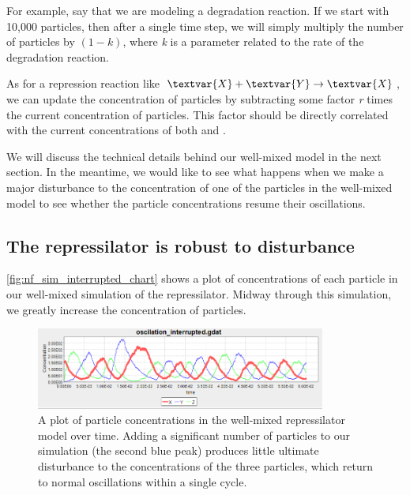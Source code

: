For example, say that we are modeling a degradation reaction. If we start with 10,000  particles, then after a single time step, we will simply multiply the number of  particles by $(1-k)$, where \textit{k} is a parameter related to the rate of the degradation reaction.

As for a repression reaction like $\textvar{X} + \textvar{Y} \rightarrow \textvar{X}$, we can update the concentration of  particles by subtracting some factor \textit{r} times the current concentration of  particles. This factor should be directly correlated with the current concentrations of both  and .

We will discuss the technical details behind our well-mixed model in the next section. In the meantime, we would like to see what happens when we make a major disturbance to the concentration of one of the particles in the well-mixed model to see whether the particle concentrations resume their oscillations.


\FloatBarrier
{}
\subsection{The repressilator is robust to disturbance}

\autoref{fig:nf_sim_interrupted_chart} shows a plot of concentrations of each particle in our well-mixed simulation of the repressilator.  Midway through this simulation, we greatly increase the concentration of  particles.

\begin{figure}[h]
\centering
\mySfFamily
\includegraphics[width = 0.85\textwidth]{../images/nf_sim_interrupted_chart.png}
\caption{A plot of particle concentrations in the well-mixed repressilator model over time. Adding a significant number of  particles to our simulation (the second blue peak) produces little ultimate disturbance to the concentrations of the three particles, which return to normal oscillations within a single cycle.}
\label{fig:nf_sim_interrupted_chart}
\end{figure}

